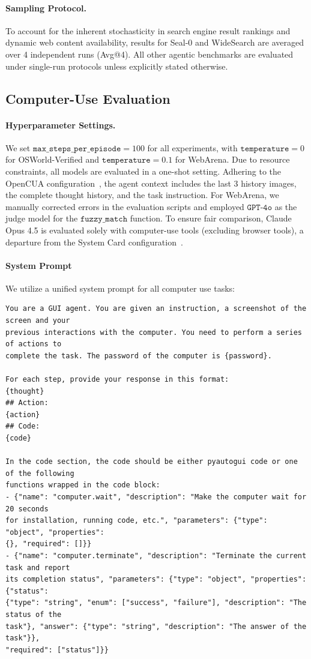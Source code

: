 \documentclass{article}
\newcommand{\citep}[1]{\parencite{#1}}
\begin{document}
\paragraph{Sampling Protocol.} 
To account for the inherent stochasticity in search engine result rankings and dynamic web content availability, results for Seal-0 and WideSearch are averaged over 4 independent runs (Avg@4). All other agentic benchmarks are evaluated under single-run protocols unless explicitly stated otherwise.

\subsection{Computer-Use Evaluation}
\label{app:eval_computer_use}

\paragraph{Hyperparameter Settings.} We set $\texttt{max\_steps\_per\_episode}=100$ for all experiments, with $\texttt{temperature}=0$ for OSWorld-Verified and $\texttt{temperature}=0.1$ for WebArena. Due to resource constraints, all models are evaluated in a one-shot setting. Adhering to the OpenCUA configuration~\citep{wang2025opencuaopenfoundationscomputeruse}, the agent context includes the last 3 history images, the complete thought history, and the task instruction. For WebArena, we manually corrected errors in the evaluation scripts and employed $\texttt{GPT-4o}$ as the judge model for the $\texttt{fuzzy\_match}$ function. To ensure fair comparison, Claude Opus 4.5 is evaluated solely with computer-use tools (excluding browser tools), a departure from the System Card configuration~\citep{opus45report}.

\paragraph{System Prompt} We utilize a unified system prompt for all computer use tasks:
{\small
\begin{verbatim}
You are a GUI agent. You are given an instruction, a screenshot of the screen and your
previous interactions with the computer. You need to perform a series of actions to 
complete the task. The password of the computer is {password}.

For each step, provide your response in this format:
{thought}
## Action:
{action}
## Code:
{code}

In the code section, the code should be either pyautogui code or one of the following 
functions wrapped in the code block:
- {"name": "computer.wait", "description": "Make the computer wait for 20 seconds 
for installation, running code, etc.", "parameters": {"type": "object", "properties": 
{}, "required": []}}
- {"name": "computer.terminate", "description": "Terminate the current task and report
its completion status", "parameters": {"type": "object", "properties": {"status": 
{"type": "string", "enum": ["success", "failure"], "description": "The status of the 
task"}, "answer": {"type": "string", "description": "The answer of the task"}}, 
"required": ["status"]}}
\end{verbatim}
}
\end{document}
